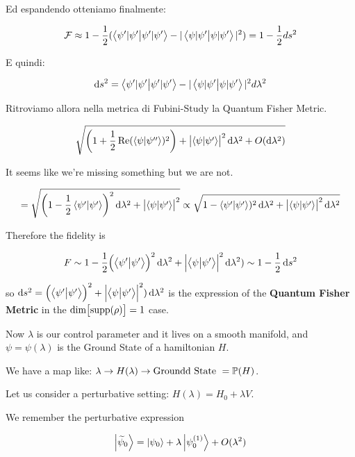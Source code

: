 \documentclass[main_zanardi.tex]{subfiles}
\begin{document}
Ed espandendo otteniamo finalmente:

\begin{align*}
\mathcal{F} \approx 1-\frac{1}{2}(\braket{\psi'|\psi'} - |\braket{\psi|\psi'}|^2) = 1-\frac{1}{2}ds^2
\end{align*}

E quindi:

\begin{align*}
\dd{s^2} = \braket{\psi'|\psi'}-|\braket{\psi|\psi'}|^2 d\lambda^2
\end{align*}

Ritroviamo allora nella metrica di Fubini-Study la Quantum Fisher Metric.

\begin{equation}
  \sqrt{\qty(1+ \frac{1}{2} \Re(\braket{\psi}{\psi''} )^2) + \abs{\braket{\psi}{\psi'} }^2 \dd{\lambda^2} + O(\dd{\lambda^2}) }
\end{equation}

It seems like we're missing something but we are not.

\begin{equation}
  = \sqrt{\qty(1 - \frac{1}{2} \braket{\psi'}{\psi'} )^2 \dd{\lambda^2} + \abs{\braket{\psi}{\psi'} }^2 }
  \propto \sqrt{1 - \braket{\psi'}{\psi'} )^2 \dd{\lambda^2}  + \abs{\braket{\psi}{\psi'} }^2 \dd{\lambda^2}}
\end{equation}

Therefore the fidelity is

\begin{equation}
  F \sim 1 - \frac{1}{2} \qty(\braket{\psi'}{\psi'} )^2 \dd{\lambda^2}  + \abs{\braket{\psi}{\psi'} }^2 \dd{\lambda^2})
  \sim 1 - \frac{1}{2}\dd{s^2}
\end{equation}

so \(\dd{s^2} = \qty(\braket{\psi'}{\psi'} )^2  + \abs{\braket{\psi}{\psi'} }^2) \dd{\lambda^2}\)
is the expression of the \textbf{Quantum Fisher Metric} in the \(\dim \qty[ \supp{\rho}] = 1\) case.

Now \(\lambda\) is our control parameter and it lives on a smooth manifold, and \(\psi = \psi(\lambda)\) is the Ground State of a hamiltonian \(H\).

We have a map like: \(\lambda \rightarrow H(\lambda) \rightarrow \text{Groundd State }  = \P H\).

Let us consider a perturbative setting: \(H(\lambda) = H_0 + \lambda V\).

We remember the perturbative expression

\begin{equation}
  \ket{\widetilde{\psi}_0 } = \ket{\psi_0} + \lambda \ket{\psi_0^{(1)}} + O(\lambda^2)
\end{equation}
\end{document}

